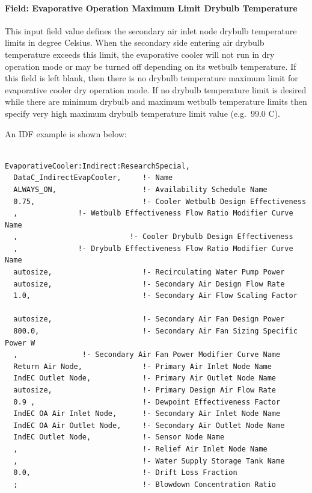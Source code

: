 \paragraph{Field: Evaporative Operation Maximum Limit Drybulb Temperature}\label{field-evaporative-operation-maximum-limit-drybulb-temperature-1}

This input field value defines the secondary air inlet node drybulb temperature limits in degree Celsius. When the secondary side entering air drybulb temperature exceeds this limit, the evaporative cooler will not run in dry operation mode or may be turned off depending on its wetbulb temperature. If this field is left blank, then there is no drybulb temperature maximum limit for evaporative cooler dry operation mode. If no drybulb temperature limit is desired while there are minimum drybulb and maximum wetbulb temperature limits then specify very high maximum drybulb temperature limit value (e.g.~99.0 C).

An IDF example is shown below:

\begin{lstlisting}

EvaporativeCooler:Indirect:ResearchSpecial,
  DataC_IndirectEvapCooler,     !- Name
  ALWAYS_ON,                    !- Availability Schedule Name
  0.75,                         !- Cooler Wetbulb Design Effectiveness
  ,              !- Wetbulb Effectiveness Flow Ratio Modifier Curve Name
  ,                          !- Cooler Drybulb Design Effectiveness
  ,              !- Drybulb Effectiveness Flow Ratio Modifier Curve Name
  autosize,                     !- Recirculating Water Pump Power
  autosize,                     !- Secondary Air Design Flow Rate
  1.0,                          !- Secondary Air Flow Scaling Factor

  autosize,                     !- Secondary Air Fan Design Power
  800.0,                        !- Secondary Air Fan Sizing Specific Power W
  ,               !- Secondary Air Fan Power Modifier Curve Name
  Return Air Node,              !- Primary Air Inlet Node Name
  IndEC Outlet Node,            !- Primary Air Outlet Node Name
  autosize,                     !- Primary Design Air Flow Rate
  0.9 ,                         !- Dewpoint Effectiveness Factor
  IndEC OA Air Inlet Node,      !- Secondary Air Inlet Node Name
  IndEC OA Air Outlet Node,     !- Secondary Air Outlet Node Name
  IndEC Outlet Node,            !- Sensor Node Name
  ,                             !- Relief Air Inlet Node Name
  ,                             !- Water Supply Storage Tank Name
  0.0,                          !- Drift Loss Fraction
  ;                             !- Blowdown Concentration Ratio
\end{lstlisting}

